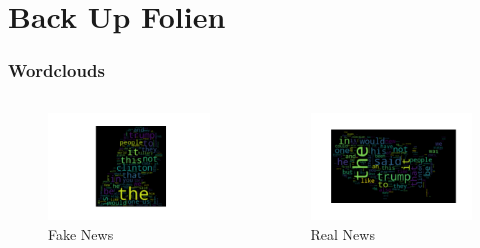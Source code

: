 \documentclass[aspectratio=1610, professionalfonts, 9pt]{beamer}
\begin{document}
\section{Back Up Folien}

  \begin{frame}
    \frametitle{Wordclouds}
    \begin{columns}
      \begin{figure}
          \includegraphics[width=\textwidth]{pictures/fake_wordcloud.pdf}
          \caption{Fake News}
          \label{}
      \end{figure}

      \begin{figure}
          \includegraphics[width=\textwidth]{pictures/real_wordcloud.pdf}
          \caption{Real News}
          \label{}
      \end{figure}
    \end{columns}
  \end{frame}
\end{document}
